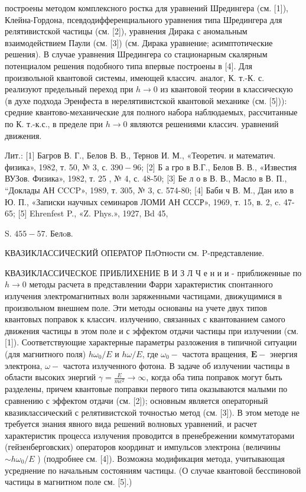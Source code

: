 \documentclass[10pt]{article}
\begin{document}
построены методом комплексного ростка для уравнений Шредингера (см. [1]), Клейна-Гордона, псевдодифференциального уравнения типа Шредингера для релятивистской частицы (см. [2]), уравнения Дирака с аномальным взаимодействием Паули (см. [3]) (см. Дирака уравнение; асимптотические решения). В случае уравнения Шредингера со стационарным скалярным потенциалом решения подобного типа впервые построены в [4]. Для произвольной квантовой системы, имеющей классич. аналог, К. т.-К. с. реализуют предельный переход при $h \rightarrow 0$ из квантовой теории в классическую (в духе подхода Эренфеста в нерелятивистской квантовой механике (см. [5])): средние квантово-механические для полного набора наблюдаемых, рассчитанные по К. т.-к.с., в пределе при $h \rightarrow 0$ являются решениями классич. уравнений движения.



Лит.: [1] Багров В. Г., Белов В. В., Тернов И. М., «Теоретич. и математич. физика», 1982, т. 50, № 3, с. $390-96$; [2] Б а гро в В.Г., Белов В. В., «Известия ВУЗов. Физика», 1982, т. 25 , № 4, с. 48-50; [3] Бе л о в В. В., Масло в В. П., “Доклады АН CCCP», 1989, т. 305, № 3, с. 574-80; [4] Баби ч В. М., Дан ило в Ю. П., «Записки научных семинаров ЛОМИ АН СССР», 1969, т. 15, в. 2, c. 47-65; [5] Ehrenfest P., «Z. Phys.», 1927, Bd 45,

S. $455-57$. Белoв.



КВАЗИКЛАССИЧЕСКИЙ ОПЕРАТОР ПлОтности см. P-представление.



КВАЗИКЛАССИЧЕСКОЕ ПРИБЛИХЕНИЕ В И З Л Ч е н и и - приближенные по $h \rightarrow 0$ методы расчета в представлении Фарри характеристик спонтанного излучения электромагнитных волн заряженными частицами, движущимися в произвольном внешнем поле. Эти методы основаны на учете двух типов квантовых поправок к классич. излучению, связанных с квантованием самого движения частицы в этом поле и с эффектом отдачи частицы при излучении (см. [1]). Соответствующие характерные параметры разложения в типичной ситуации (для магнитного поля) $h \omega_{0} / E$ и $h \omega / E$, где $\omega_{0}-$ частота вращения, $\boldsymbol{E}-$ энергия электрона, $\omega-$ частота излученного фотона. В задаче об излучении частицы в области высоких энергий $\gamma=\frac{E}{m c^{2}} \rightarrow \infty$, когда оба типа поправок могут быть разделены, причем квантовые поправки первого типа оказываются малыми по сравнению с эффектом отдачи (см. [2]); основным является операторный квазиклассический с релятивистской точностью метод (см. [3]). В этом методе не требуется знания явного вида решений волновых уравнений, и расчет характеристик процесса излучения проводится в пренебрежении коммутаторами (гейзенберговских) операторов координат и импульсов электрона (величины $\sim h \omega_{0} / E$ ) (подробнее см. [4]). Возможна модификация метода, учитывающая усреднение по начальным состояниям частицы. (О случае квантовой бесспиновой частицы в магнитном поле см. [5].)
\end{document}
